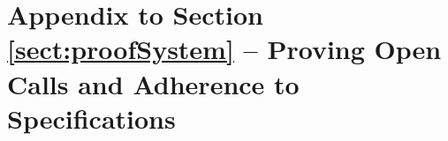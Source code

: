 \section{Appendix to Section \ref{sect:proofSystem} -- Proving Open Calls and Adherence to \SpecLang Specifications}